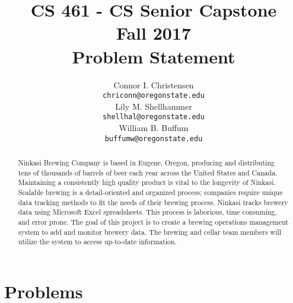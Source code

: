 \documentclass[draftclsnofoot,onecolumn,letterpaper,10pt]{IEEEtran}
\title{CS 461 - CS Senior Capstone
	\\Fall 2017
	\\Problem Statement
}
\author{
	Connor I. Christensen \\
	\texttt{chriconn@oregonstate.edu}
	\\
	Lily M. Shellhammer \\
	\texttt{shellhal@oregonstate.edu}
	\\
	William B. Buffum \\
	\texttt{buffumw@oregonstate.edu}
}
\begin{document}
\begin{titlingpage}
    \maketitle
    \begin{abstract}
			Ninkasi Brewing Company is based in Eugene, Oregon, producing and distributing tens of thousands of barrels of beer each year across the United States and Canada.
			Maintaining a consistently high quality product is vital to the longevity of Ninkasi.
			Scalable brewing is a detail-oriented and organized process; companies require unique data tracking methods to fit the needs of their brewing process.
			Ninkasi tracks brewery data using Microsoft Excel spreadsheets.
			This process is laborious, time consuming, and error prone.
			The goal of this project is to create a brewing operations management system to add and monitor brewery data.
			The brewing and cellar team members will utilize the system to access up-to-date information.
    \end{abstract}
		\pagebreak
		\tableofcontents
\end{titlingpage}

\section{Problems}
\end{document}

